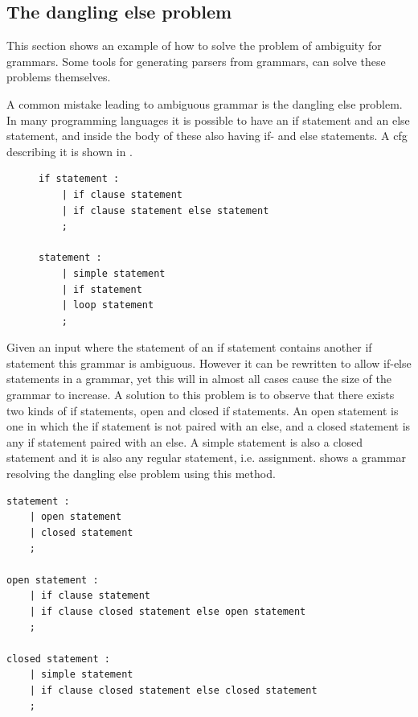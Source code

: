 \subsection{The dangling else problem} 
This section shows an example of how to solve the problem of ambiguity for grammars. 
Some tools for generating parsers from grammars, can solve these problems themselves.

A common mistake leading to ambiguous grammar is the dangling else problem. \citep{danglingelse}
In many programming languages it is possible to have an if statement and an else statement, and inside the body of these also having if- and else statements. 
A \acrshort{cfg} describing it is shown in .
\begin{figure}
\begin{lstlisting}[caption={An example of a \acrshort{cfg} describing an if statement. \citep{danglingelse}},frame=tlrb,label={lst:danglingelseex1},numbers=none]
if statement :
    | if clause statement
    | if clause statement else statement
    ;

statement :
    | simple statement
    | if statement
    | loop statement
    ;
\end{lstlisting}
\end{figure}
Given an input where the statement of an if statement contains another if statement this grammar is ambiguous.  
However it can be rewritten to allow if-else statements in a grammar, yet this will in almost all cases cause the size of the grammar to increase. 
A solution to this problem is to observe that there exists two kinds of if statements, open and closed if statements.
An open statement is one in which the if statement is not paired with an else, and a closed statement is any if statement paired with an else.
A simple statement is also a closed statement and it is also any regular statement, i.e. assignment.
 shows a grammar resolving the dangling else problem using this method.


\begin{lstlisting}[caption={An example of a \acrshort{cfg} describing an if statement, that is not ambiguous. \citep{danglingelse}},frame=tlrb,label={lst:danglingelseex2},numbers=none]
statement :
    | open statement
    | closed statement
    ;

open statement :
    | if clause statement
    | if clause closed statement else open statement
    ;

closed statement :
    | simple statement
    | if clause closed statement else closed statement
    ;
\end{lstlisting}

